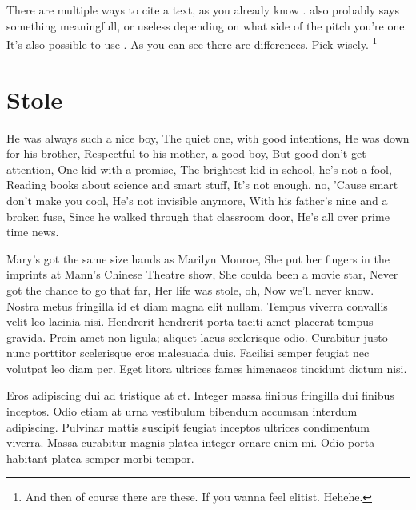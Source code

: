 There are multiple ways to cite a text, as you already know \citep{colu92}. \citet{gree00} also probably says something meaningfull, or useless depending on what side of the pitch you're one. It's also possible to use \cite{smit54}. As you can see there are differences. Pick wisely. \footnote{And then of course there are these. If you wanna feel elitist. Hehehe.}

\section{Stole}
He was always such a nice boy, The quiet one, with good intentions, He was down for his brother, Respectful to his mother, a good boy, But good don't get attention, One kid with a promise, The brightest kid in school, he's not a fool, Reading books about science and smart stuff, It's not enough, no, 'Cause smart don't make you cool, He's not invisible anymore, With his father's nine and a broken fuse, Since he walked through that classroom door, He's all over prime time news.

Mary's got the same size hands as Marilyn Monroe, She put her fingers in the imprints at Mann's Chinese Theatre show, She coulda been a movie star, Never got the chance to go that far, Her life was stole, oh, Now we'll never know.
Nostra metus fringilla id et diam magna elit nullam. Tempus viverra convallis velit leo lacinia nisi. Hendrerit hendrerit porta taciti amet placerat tempus gravida. Proin amet non ligula; aliquet lacus scelerisque odio. Curabitur justo nunc porttitor scelerisque eros malesuada duis. Facilisi semper feugiat nec volutpat leo diam per. Eget litora ultrices fames himenaeos tincidunt dictum nisi.

Eros adipiscing dui ad tristique at et. Integer massa finibus fringilla dui finibus inceptos. Odio etiam at urna vestibulum bibendum accumsan interdum adipiscing. Pulvinar mattis suscipit feugiat inceptos ultrices condimentum viverra. Massa curabitur magnis platea integer ornare enim mi. Odio porta habitant platea semper morbi tempor.

